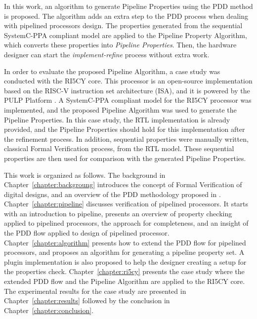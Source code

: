 In this work, an algorithm to generate Pipeline Properties using the PDD method is proposed. The algorithm adds an extra step to the PDD process when dealing with pipelined processors design. The properties generated from the sequential SystemC-PPA compliant model are applied to the Pipeline Property Algorithm, which converts these properties into \textit{Pipeline Properties}. Then, the hardware designer can start the \textit{implement-refine} process without extra work.

In order to evaluate the proposed Pipeline Algorithm, a case study was conducted with the RI5CY core. This processor is an open-source implementation based on the RISC-V instruction set architecture (ISA), and it is powered by the PULP Platform \cite{pulp}. A SystemC-PPA compliant model for the RI5CY processor was implemented, and the proposed Pipeline Algorithm was used to generate the Pipeline Properties. In this case study, the RTL implementation is already provided, and the Pipeline Properties should hold for this implementation after the refinement process. In addition, sequential properties were manually written, classical Formal Verification process, from the RTL model. These sequential properties are then used for comparison with the generated Pipeline Properties.

This work is organized as follows. The background in Chapter~\ref{chapter:backgroung} introduces the concept of Formal Verification of digital designs, and an overview of the PDD methodology proposed in \cite{paper-pdd}. Chapter~\ref{chapter:pipeline} discusses verification of pipelined processors. It starts with an introduction to pipeline, presents an overview of property checking applied to pipelined processors, the \SSQED{}\cite{paper-symbolic} approach for completeness, and an insight of the PDD flow applied to design of pipelined processor. Chapter~\ref{chapter:algorithm} presents how to extend the PDD flow for pipelined processors, and proposes an algorithm for generating a pipeline property set. A plugin implementation is also proposed to help the designer creating a setup for the \SSQED{} properties check. Chapter~\ref{chapter:ri5cy} presents the case study where the extended PDD flow and the Pipeline Algorithm are applied to the RI5CY core. The experimental results for the case study are presented in Chapter~\ref{chapter:results} followed by the conclusion in Chapter~\ref{chapter:conclusion}.




